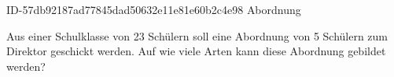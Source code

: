 \begin{exercise}
      {ID-57db92187ad77845dad50632e11e81e60b2c4e98}
      {Abordnung}
  \ifproblem\problem\par
    Aus einer Schulklasse von 23 Schülern soll eine Abordnung von 5 Schülern
    zum Direktor geschickt werden. Auf wie viele Arten kann diese Abordnung
    gebildet werden?
  \fi
\end{exercise}

